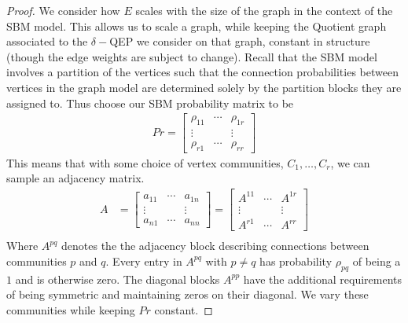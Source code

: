 \documentclass[%
 aip,
 amsmath,amssymb,
preprint,
reprint, onecolumn %
]{revtex4-1}
\begin{document}
\begin{proof}
    We consider how $E$ scales with the size of the graph in the context of the SBM model. This allows us to scale a graph, while keeping the Quotient graph associated to the $\delta-$QEP we consider on that graph, constant in structure (though the edge weights are subject to change). Recall that the SBM model involves a partition of the vertices such that the connection probabilities between vertices in the graph model are determined solely by the partition blocks they are assigned to. Thus choose our SBM probability matrix to be 
    \begin{align*}
        Pr=
        \begin{bmatrix}
            \rho_{11} & \cdots & \rho_{1r}\\
            \vdots & & \vdots \\
            \rho_{r1} & \cdots & \rho_{rr}
        \end{bmatrix}
    \end{align*}
    This means that with some choice of vertex communities, $C_1,\dotsc, C_r$, we can sample an adjacency matrix.  
    \begin{align*}
        A &= 
        \begin{bmatrix}
            a_{11} & \cdots & a_{1n}\\
            \vdots & & \vdots \\
            a_{n1} & \cdots & a_{nn}
        \end{bmatrix}
        = 
        \begin{bmatrix}
            A^{11} & \cdots & A^{1r}\\
            \vdots & & \vdots \\
            A^{r1} & \cdots & A^{rr}
        \end{bmatrix}\\
    \end{align*}
    Where $A^{pq}$ denotes the the adjacency block describing connections between communities $p$ and $q$. Every entry in $A^{pq}$ with $p\neq q$ has probability $\rho_{pq}$ of being a $1$ and is otherwise zero. The diagonal blocks $A^{pp}$ have the additional requirements of being symmetric and maintaining zeros on their diagonal. We vary these communities while keeping $Pr$ constant. 
    

\end{proof}
\end{document}
